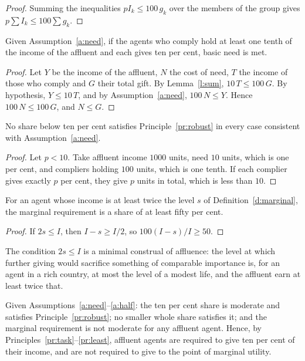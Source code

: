 \documentclass{situationist-preprint}
\begin{document}
\begin{proof}
Summing the inequalities $pI_k \leq 100\,g_k$ over the members of the group gives $p\sum I_k \leq 100 \sum g_k$.
\end{proof}

\begin{theorem}[Sufficiency]\label{t:sufficiency}
Given Assumption~\ref{a:need}, if the agents who comply hold at least one tenth of the income of the affluent and each gives ten per cent, basic need is met.
\end{theorem}

\begin{proof}
Let $Y$ be the income of the affluent, $N$ the cost of need, $T$ the income of those who comply and $G$ their total gift. By Lemma~\ref{l:sum}, $10\,T \leq 100\,G$. By hypothesis, $Y \leq 10\,T$, and by Assumption~\ref{a:need}, $100\,N \leq Y$. Hence $100\,N \leq 100\,G$, and $N \leq G$.
\end{proof}

\begin{proposition}[Minimality]\label{p:minimal}
No share below ten per cent satisfies Principle~\ref{pr:robust} in every case consistent with Assumption~\ref{a:need}.
\end{proposition}

\begin{proof}
Let $p < 10$. Take affluent income $1000$ units, need $10$ units, which is one per cent, and compliers holding $100$ units, which is one tenth. If each complier gives exactly $p$ per cent, they give $p$ units in total, which is less than $10$.
\end{proof}

\begin{proposition}\label{p:half}
For an agent whose income is at least twice the level $s$ of Definition~\ref{d:marginal}, the marginal requirement is a share of at least fifty per cent.
\end{proposition}

\begin{proof}
If $2s \leq I$, then $I - s \geq I/2$, so $100(I-s)/I \geq 50$.
\end{proof}

The condition $2s \leq I$ is a minimal construal of affluence: the level at which further giving would sacrifice something of comparable importance is, for an agent in a rich country, at most the level of a modest life, and the affluent earn at least twice that.

\begin{theorem}\label{t:moderate}
Given Assumptions~\ref{a:need}--\ref{a:half}: the ten per cent share is moderate and satisfies Principle~\ref{pr:robust}; no smaller whole share satisfies it; and the marginal requirement is not moderate for any affluent agent. Hence, by Principles~\ref{pr:task}--\ref{pr:least}, affluent agents are required to give ten per cent of their income, and are not required to give to the point of marginal utility.
\end{theorem}
\end{document}
